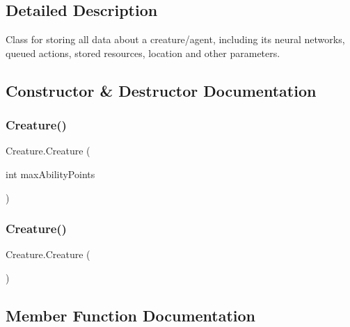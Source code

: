 \subsection{Detailed Description}
Class for storing all data about a creature/agent, including its neural networks, queued actions, stored resources, location and other parameters. 



\subsection{Constructor \& Destructor Documentation}
\mbox{\label{class_creature_a33b98848ab1feddad8bf7badb46f8e57}} 
\subsubsection{\texorpdfstring{Creature()}{Creature()}\hspace{0.1cm}{\footnotesize\ttfamily [1/2]}}
{\footnotesize\ttfamily Creature.\+Creature (\begin{DoxyParamCaption}\item[{int}]{max\+Ability\+Points }\end{DoxyParamCaption})}

\mbox{\label{class_creature_acd97b133e2a8f2fb38a7686ffd7a3fdc}} 
\subsubsection{\texorpdfstring{Creature()}{Creature()}\hspace{0.1cm}{\footnotesize\ttfamily [2/2]}}
{\footnotesize\ttfamily Creature.\+Creature (\begin{DoxyParamCaption}{ }\end{DoxyParamCaption})}



\subsection{Member Function Documentation}
\mbox{\label{class_creature_a5c8e2c97a66f511939fc89bd349017d3}} 
